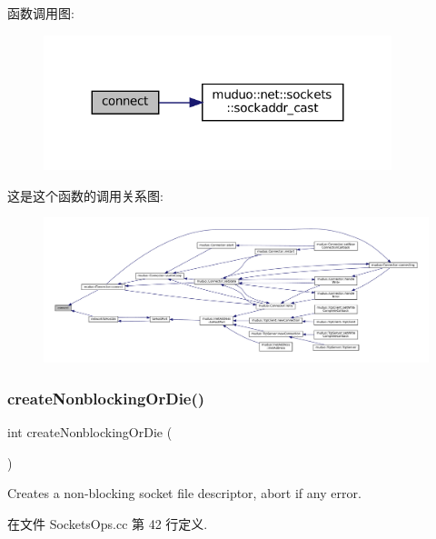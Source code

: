 函数调用图\+:
\nopagebreak
\begin{figure}[H]
\begin{center}
\leavevmode
\includegraphics[width=287pt]{namespacemuduo_1_1sockets_a349a8d2188d9632596b2e5213cb16436_cgraph}
\end{center}
\end{figure}
这是这个函数的调用关系图\+:
\nopagebreak
\begin{figure}[H]
\begin{center}
\leavevmode
\includegraphics[width=350pt]{namespacemuduo_1_1sockets_a349a8d2188d9632596b2e5213cb16436_icgraph}
\end{center}
\end{figure}
\mbox{\label{namespacemuduo_1_1sockets_a91269e56d86b2e78e693b330e5c665aa}} 
\subsubsection{\texorpdfstring{create\+Nonblocking\+Or\+Die()}{createNonblockingOrDie()}}
{\footnotesize\ttfamily int create\+Nonblocking\+Or\+Die (\begin{DoxyParamCaption}{ }\end{DoxyParamCaption})}

Creates a non-\/blocking socket file descriptor, abort if any error. 

在文件 Sockets\+Ops.\+cc 第 42 行定义.



